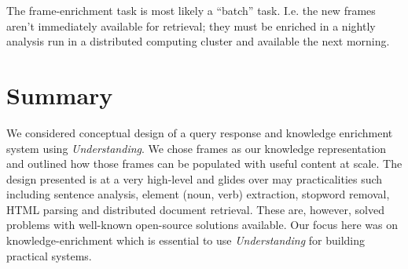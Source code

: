 \documentclass[10pt,letterpaper]{article}
\begin{document}
The frame-enrichment task is most likely a ``batch'' task. I.e. the new frames aren't immediately available for retrieval; they must be enriched in a nightly analysis run in a distributed computing cluster and available the next morning. 

\section{Summary}
We considered conceptual design of a query response and knowledge enrichment system using {\em Understanding}. We chose frames as our knowledge representation and outlined how those frames can be populated with useful content at scale. The design presented is at a very high-level and glides over may practicalities such including sentence analysis, element (noun, verb) extraction, stopword removal, HTML parsing and distributed document retrieval. These are, however, solved problems with well-known open-source solutions available. Our focus here was on knowledge-enrichment which is essential to use {\em Understanding} for building practical systems.
\end{document}
